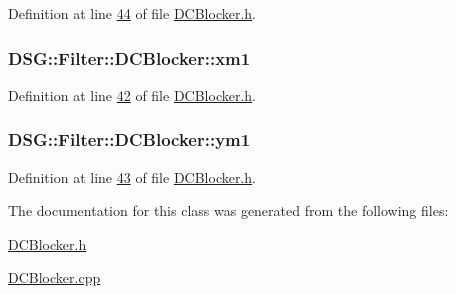 Definition at line \hyperlink{_d_c_blocker_8h_source_l00044}{44} of file \hyperlink{_d_c_blocker_8h_source}{D\+C\+Blocker.\+h}.

\hypertarget{class_d_s_g_1_1_filter_1_1_d_c_blocker_aace7bdafac8d0b4acf9d09bb368f6486}{
\subsubsection[{xm1}]{ D\+S\+G\+::\+Filter\+::\+D\+C\+Blocker\+::xm1\hspace{0.3cm}{\ttfamily [protected]}}}\label{class_d_s_g_1_1_filter_1_1_d_c_blocker_aace7bdafac8d0b4acf9d09bb368f6486}


Definition at line \hyperlink{_d_c_blocker_8h_source_l00042}{42} of file \hyperlink{_d_c_blocker_8h_source}{D\+C\+Blocker.\+h}.

\hypertarget{class_d_s_g_1_1_filter_1_1_d_c_blocker_a61689c80d7fb0f25144fc84996396d71}{
\subsubsection[{ym1}]{ D\+S\+G\+::\+Filter\+::\+D\+C\+Blocker\+::ym1\hspace{0.3cm}{\ttfamily [protected]}}}\label{class_d_s_g_1_1_filter_1_1_d_c_blocker_a61689c80d7fb0f25144fc84996396d71}


Definition at line \hyperlink{_d_c_blocker_8h_source_l00043}{43} of file \hyperlink{_d_c_blocker_8h_source}{D\+C\+Blocker.\+h}.



The documentation for this class was generated from the following files\+:\begin{DoxyCompactItemize}
\item 
\hyperlink{_d_c_blocker_8h}{D\+C\+Blocker.\+h}\item 
\hyperlink{_d_c_blocker_8cpp}{D\+C\+Blocker.\+cpp}\end{DoxyCompactItemize}
